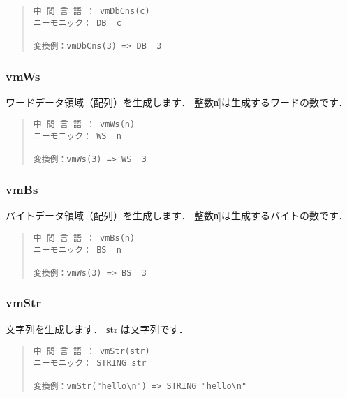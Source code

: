 \begin{quote}
\begin{verbatim}
中 間 言 語 ： vmDbCns(c)
ニーモニック： DB  c   

変換例：vmDbCns(3) => DB  3
\end{verbatim}
\end{quote}

\subsubsection{vmWs}

ワードデータ領域（配列）を生成します．
整数\|n|は生成するワードの数です．

\begin{quote}
\begin{verbatim}
中 間 言 語 ： vmWs(n)
ニーモニック： WS  n

変換例：vmWs(3) => WS  3
\end{verbatim}
\end{quote}

\subsubsection{vmBs}

バイトデータ領域（配列）を生成します．
整数\|n|は生成するバイトの数です．

\begin{quote}
\begin{verbatim}
中 間 言 語 ： vmBs(n)
ニーモニック： BS  n

変換例：vmWs(3) => BS  3
\end{verbatim}
\end{quote}

\subsubsection{vmStr}

文字列を生成します．
\|str|は文字列です．

\begin{quote}
\begin{verbatim}
中 間 言 語 ： vmStr(str)
ニーモニック： STRING str

変換例：vmStr("hello\n") => STRING "hello\n"
\end{verbatim}
\end{quote}
